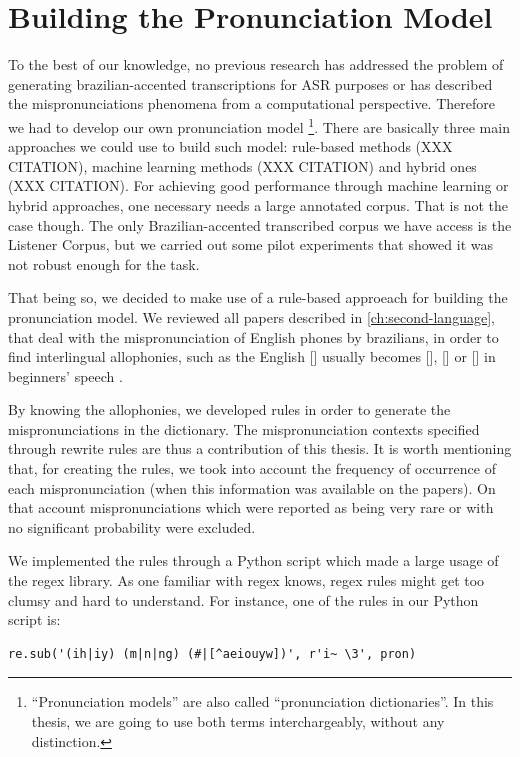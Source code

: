 \section{Building the Pronunciation Model}

To the best of our knowledge, no previous research has addressed the problem of generating brazilian-accented 
transcriptions for \ac{ASR} purposes or has described the mispronunciations phenomena from a computational perspective. 
Therefore we had to develop our own pronunciation model
\footnote{``Pronunciation models'' are also called ``pronunciation dictionaries''. In this thesis, we are going to
use both terms interchargeably, without any distinction.}. There are basically 
three main approaches we could use to build such model: rule-based methods (XXX CITATION), machine learning methods (XXX CITATION)
and hybrid ones (XXX CITATION). For achieving good performance through machine learning or hybrid approaches, one necessary 
needs a large annotated corpus. That is not the case though. The only Brazilian-accented transcribed corpus we have access
is the Listener Corpus, but we carried out some pilot experiments that showed it was not robust enough for the task.

That being so, we decided to make use of a rule-based approeach for building the pronunciation model. We reviewed all papers 
described in \autoref{ch:second-language}, that deal with the mispronunciation of English phones by brazilians, in order to find 
interlingual allophonies, such as the English [] usually becomes [], [] or [] in 
beginners' speech \citep{Reis2006}. 

By knowing the allophonies, we developed rules in order to generate the mispronunciations in the dictionary. The mispronunciation contexts
specified through rewrite rules are thus a contribution of this thesis. It is worth mentioning that, for creating the rules, we
took into account the frequency of occurrence of each mispronunciation (when this information was available 
on the papers). On that account mispronunciations which were reported as being very rare or with no significant probability were excluded.

We implemented the rules through a Python script which made a large usage of the \ac{regex} library. As one familiar 
with \ac{regex} knows, \ac{regex} rules might get too clumsy and hard to understand. For instance, one of the rules in our Python script is:

\begin{lstlisting}[float=!h,caption=Example of a fully-specified regex rule.]
re.sub('(ih|iy) (m|n|ng) (#|[^aeiouyw])', r'i~ \3', pron)
\end{lstlisting}

